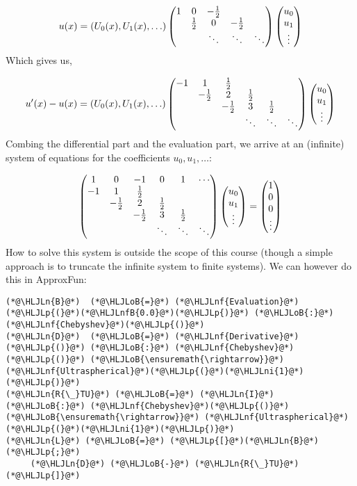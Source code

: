 \documentclass[12pt,landscape]{article}
\newcommand{\HLJLn}[1]{#1}
\newcommand{\HLJLnf}[1]{\textcolor[RGB]{66,102,213}{#1}}
\newcommand{\HLJLnfB}[1]{\textcolor[RGB]{59,151,46}{#1}}
\newcommand{\HLJLni}[1]{\textcolor[RGB]{59,151,46}{#1}}
\newcommand{\HLJLoB}[1]{\textcolor[RGB]{102,102,102}{\textbf{#1}}}
\newcommand{\HLJLp}[1]{#1}
\def\half{ {1 \over 2} }
\begin{document}
{\[
u(x) = (U_0(x),U_1(x),\ldots) \begin{pmatrix}
    1 &0 & -\half \cr
& \half & 0 & -\half \cr
&&\ddots & \ddots & \ddots
\end{pmatrix}\begin{pmatrix} u_0\\u_1\\\vdots \end{pmatrix}
\]
Which gives us,

\[
u'(x) - u(x) =  (U_0(x),U_1(x),\ldots)  \begin{pmatrix}
    -1 &1 & \half \cr
& -\half & 2 & \half \cr
&& -\half & 3 & \half \cr
&&&\ddots & \ddots & \ddots
\end{pmatrix} \begin{pmatrix} u_0\\u_1\\\vdots \end{pmatrix}
\]
Combing the differential part and the evaluation part, we arrive at an (infinite) system of equations for the coefficients $u_0,u_1,\dots$:

\[
\begin{pmatrix}
      1 & 0 & -1 & 0 & 1 & \cdots \\
    -1 &1 & \half \cr
& -\half & 2 & \half \cr
&& -\half & 3 & \half \cr
&&&\ddots & \ddots & \ddots
\end{pmatrix} \begin{pmatrix} u_0\\u_1\\\vdots \end{pmatrix}  = \begin{pmatrix} 1 \\ 0 \\ 0 \\ \vdots \end{pmatrix}
\]
How to solve this system is outside the scope of this course (though a simple approach is to truncate the infinite system to finite systems). We can however do this in ApproxFun:


\begin{lstlisting}
(*@\HLJLn{B}@*)  (*@\HLJLoB{=}@*) (*@\HLJLnf{Evaluation}@*)(*@\HLJLp{(}@*)(*@\HLJLnfB{0.0}@*)(*@\HLJLp{)}@*) (*@\HLJLoB{:}@*) (*@\HLJLnf{Chebyshev}@*)(*@\HLJLp{()}@*)
(*@\HLJLn{D}@*)  (*@\HLJLoB{=}@*) (*@\HLJLnf{Derivative}@*)(*@\HLJLp{()}@*) (*@\HLJLoB{:}@*) (*@\HLJLnf{Chebyshev}@*)(*@\HLJLp{()}@*) (*@\HLJLoB{\ensuremath{\rightarrow}}@*) (*@\HLJLnf{Ultraspherical}@*)(*@\HLJLp{(}@*)(*@\HLJLni{1}@*)(*@\HLJLp{)}@*)
(*@\HLJLn{R{\_}TU}@*) (*@\HLJLoB{=}@*) (*@\HLJLn{I}@*) (*@\HLJLoB{:}@*) (*@\HLJLnf{Chebyshev}@*)(*@\HLJLp{()}@*) (*@\HLJLoB{\ensuremath{\rightarrow}}@*) (*@\HLJLnf{Ultraspherical}@*)(*@\HLJLp{(}@*)(*@\HLJLni{1}@*)(*@\HLJLp{)}@*)
(*@\HLJLn{L}@*) (*@\HLJLoB{=}@*) (*@\HLJLp{[}@*)(*@\HLJLn{B}@*)(*@\HLJLp{;}@*)
     (*@\HLJLn{D}@*) (*@\HLJLoB{-}@*) (*@\HLJLn{R{\_}TU}@*)(*@\HLJLp{]}@*)
\end{lstlisting}

}
\end{document}

